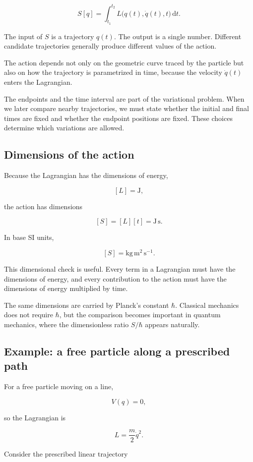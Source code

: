 \[
\boxed{
S[q]
=
\int_{t_{1}}^{t_{2}}
L\bigl(q(t),\dot q(t),t\bigr)
\,\mathrm{d}t
}.
\]

The input of \(S\) is a trajectory \(q(t)\). The output is a single number. Different candidate trajectories generally produce different values of the action.

The action depends not only on the geometric curve traced by the particle but also on how the trajectory is parametrized in time, because the velocity \(\dot q(t)\) enters the Lagrangian.

The endpoints and the time interval are part of the variational problem. When we later compare nearby trajectories, we must state whether the initial and final times are fixed and whether the endpoint positions are fixed. These choices determine which variations are allowed.

\subsection{Dimensions of the action}

Because the Lagrangian has the dimensions of energy,

\[
[L]=\mathrm{J},
\]

the action has dimensions

\[
[S]
=
[L][t]
=
\mathrm{J\,s}.
\]

In base SI units,

\[
[S]
=
\mathrm{kg\,m^{2}\,s^{-1}}.
\]

This dimensional check is useful. Every term in a Lagrangian must have the dimensions of energy, and every contribution to the action must have the dimensions of energy multiplied by time.

The same dimensions are carried by Planck's constant \(\hbar\). Classical mechanics does not require \(\hbar\), but the comparison becomes important in quantum mechanics, where the dimensionless ratio \(S/\hbar\) appears naturally.

\subsection{Example: a free particle along a prescribed path}

For a free particle moving on a line,

\[
V(q)=0,
\]

so the Lagrangian is

\[
L
=
\frac{m}{2}\dot q^{2}.
\]

Consider the prescribed linear trajectory

